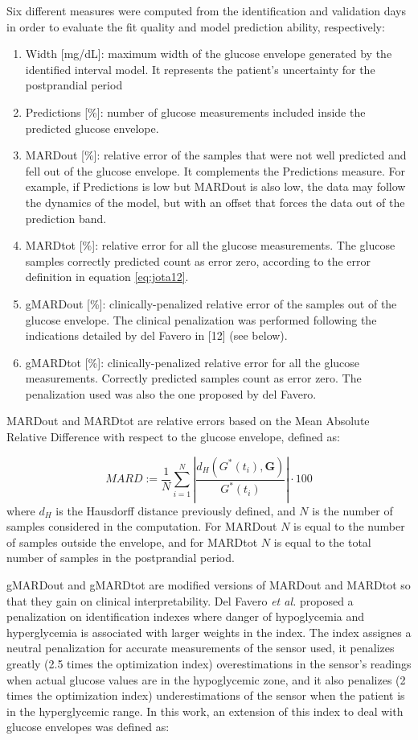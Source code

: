 Six different measures were computed from the identification and validation days in order to evaluate the fit quality and model prediction ability, respectively:

\begin{enumerate}
	\item Width [mg/dL]:  maximum width of the glucose envelope generated by the identified interval model. It represents the patient's uncertainty for the postprandial period 
	\item Predictions [\%]: number of glucose measurements included inside the predicted glucose envelope.
	\item MARDout [\%]: relative error of the samples that were not well predicted and fell out of the glucose envelope. It complements the Predictions measure. For example, if Predictions is low but MARDout is also low, the data may follow the dynamics of the model, but with an offset that forces the data out of the prediction band. 
	\item MARDtot [\%]:  relative error for all the glucose measurements. The glucose samples correctly predicted count as error zero, according to the error definition in equation \eqref{eq:jota12}. 
	\item gMARDout [\%]: clinically-penalized relative error of the samples out of the glucose envelope. The clinical penalization was performed following the indications detailed by del Favero in [12] (see below).
	\item gMARDtot [\%]: clinically-penalized relative error for all the glucose measurements.  Correctly predicted samples count as error zero. The penalization used was also the one proposed by del Favero.
\end{enumerate}

MARDout and MARDtot are relative errors based on the Mean Absolute Relative Difference with respect to the glucose envelope, defined as:

\begin{equation}
	MARD:=\frac{1}{N} \sum\limits_{i=1}^{N} \left| \frac{ d_H(G^{\ast}(t_i),\boldsymbol{G})}{G^{\ast}(t_i)} \right| \cdot 100		
\label{eq:mard2}
\end{equation}
where $d_H$ is the Hausdorff distance previously defined, and $N$ is the number of samples considered in the computation. For MARDout $N$ is equal to the number of samples outside the envelope, and for MARDtot $N$ is equal to the total number of samples in the postprandial period.

gMARDout and gMARDtot are modified versions of MARDout and MARDtot so that they gain on clinical interpretability. Del Favero \textit{et al.} \cite{del2012glucose} proposed a penalization on identification indexes where danger of hypoglycemia and hyperglycemia is associated with larger weights in the index. The index assignes a neutral penalization for accurate measurements of the sensor used, it penalizes greatly (2.5 times the optimization index) overestimations in the sensor's readings when actual glucose values are in the hypoglycemic zone, and it also penalizes (2 times the optimization index) underestimations of the sensor when the patient is in the hyperglycemic range. In this work, an extension of this index to deal with glucose envelopes was defined as:

